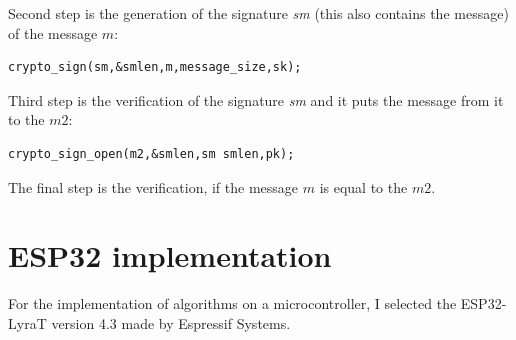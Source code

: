 \documentclass[thesis=M,english]{FITthesis}[2019/12/23]
\begin{document}
\bigskip
\noindent
Second step is the generation of the signature \textit{sm} (this also contains the message) of the message $m$:
\begin{lstlisting}[frame=single]
crypto_sign(sm,&smlen,m,message_size,sk);
\end{lstlisting}

\bigskip
\noindent
Third step is the verification of the signature \textit{sm} and it puts the message from it to the $m2$:
\begin{lstlisting}[frame=single]
crypto_sign_open(m2,&smlen,sm smlen,pk);
\end{lstlisting}

\noindent
The final step is the verification, if the message $m$ is equal to the $m2$.

\newpage
\section{ESP32 implementation} \label{ESP32_impl}
For the implementation of algorithms on a microcontroller, I selected the ESP32-LyraT version 4.3 made by Espressif Systems.
\end{document}
